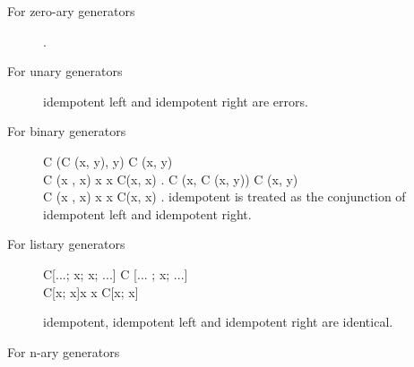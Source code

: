 \begin{description}

\item[For zero-ary generators] \na.
\item[For unary generators] 
idempotent left and idempotent right are errors.
\item[For binary generators] 
{ C (C (x, y), y) \rw C (x, y) \\
  C (x , x) \rw x  x  C(x, x) . 
}
{ C (x, C (x, y)) \rw C (x, y) \\
  C (x , x) \rw x  x  C(x, x) . 
}
idempotent is treated as the conjunction of idempotent left and
idempotent right.

\item[For listary generators] 
{C[...; x; x; ...] \rw C [... ; x; ...] \\
 C[x; x]\rw x   x  C[x; x] 
}

idempotent, idempotent left and idempotent right are identical.
\item[For n-ary generators] \na

\end{description}

